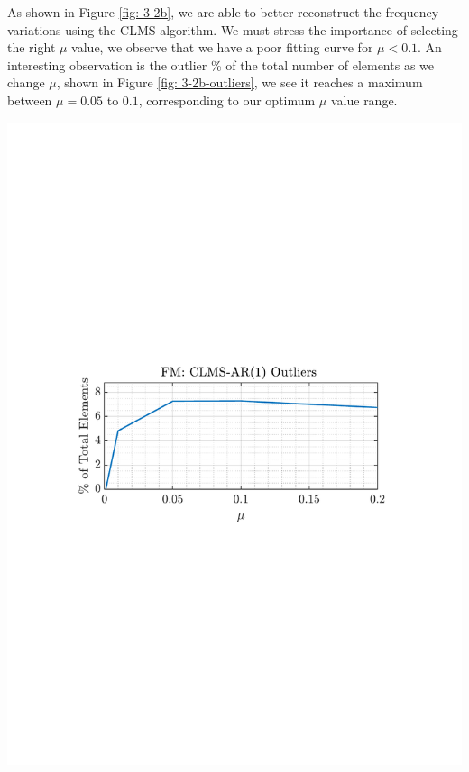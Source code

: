 \documentclass[12pt]{article}
\begin{document}
			\begin{minipage}[b]{0.49\textwidth}
				As shown in Figure \ref{fig: 3-2b}, we are able to better reconstruct the frequency variations using the CLMS algorithm. We must stress the importance of selecting the right $\mu$ value, we observe that we have a poor fitting curve for $\mu<0.1$. An interesting observation is the outlier \% of the total number of elements as we change $\mu$, shown in Figure \ref{fig: 3-2b-outliers}, we see it reaches a maximum between $\mu=0.05$ to $0.1$, corresponding to our optimum $\mu$ value range.
			\end{minipage}%
			\begin{minipage}{0.04\textwidth}
				\hspace*{0.04\textwidth}
			\end{minipage}%
			\begin{minipage}[t]{0.49\textwidth}
				\centering
				\includegraphics[trim={2.2cm 11.2cm 3.15cm  11.2cm}, clip, width=\textwidth]{../MATLAB/figures/q3_2b_fig06.pdf} 

				\captionsetup{justification=centering}
				\label{fig: 3-2b-outliers}
			\end{minipage}%
\end{document}
